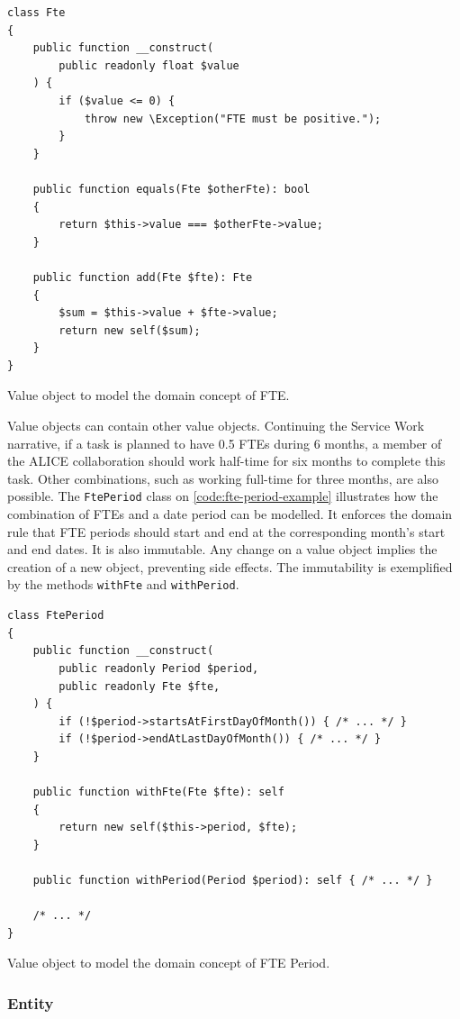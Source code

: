 \begin{listing}[htbp]
\begin{verbatim}
class Fte
{
	public function __construct(
		public readonly float $value
	) {
		if ($value <= 0) {
			throw new \Exception("FTE must be positive.");
		}		
	}

	public function equals(Fte $otherFte): bool
	{
		return $this->value === $otherFte->value;
	}

	public function add(Fte $fte): Fte
	{
		$sum = $this->value + $fte->value;
		return new self($sum);
	}
}
\end{verbatim}
\caption{Value object to model the domain concept of FTE.}
\label{code:fte-example}
\end{listing}

Value objects can contain other value objects. Continuing the Service Work narrative, if a task is planned to have 0.5 FTEs during 6 months, a member of the ALICE collaboration should work half-time for six months to complete this task. Other combinations, such as working full-time for three months, are also possible. The \texttt{FtePeriod} class on \autoref{code:fte-period-example} illustrates how the combination of FTEs and a date period can be modelled. It enforces the domain rule that FTE periods should start and end at the corresponding month's start and end dates. It is also immutable. Any change on a value object implies the creation of a new object, preventing side effects. The immutability is exemplified by the methods \texttt{withFte} and \texttt{withPeriod}.

\begin{listing}[htbp]
\begin{verbatim}
class FtePeriod
{
	public function __construct(
		public readonly Period $period,
		public readonly Fte $fte,
	) {
		if (!$period->startsAtFirstDayOfMonth()) { /* ... */ }
		if (!$period->endAtLastDayOfMonth()) { /* ... */ }
	}

	public function withFte(Fte $fte): self
	{
		return new self($this->period, $fte);
	}

	public function withPeriod(Period $period): self { /* ... */ }

	/* ... */
}
\end{verbatim}
\caption{Value object to model the domain concept of FTE Period.}
\label{code:fte-period-example}
\end{listing}

\subsubsection{Entity}

